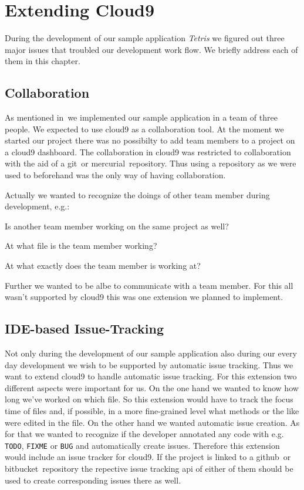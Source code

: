 \section{Extending Cloud9}
\label{sec:Approaches}
During the development of our sample application \emph{Tetris} we figured out three major issues that troubled our development work flow.
We briefly address each of them in this chapter.

\subsection{Collaboration}
As mentioned in~ we implemented our sample application in a team of three people.
We expected to use cloud9 as a collaboration tool.
At the moment we started our project there was no possibilty to add team members to a project on a cloud9 dashboard.
The collaboration in cloud9 was restricted to collaboration with the aid of a git~\needcite or mercurial~\needcite repository.
Thus using a repository as we were used to beforehand was the only way of having collaboration.

Actually we wanted to recognize the doings of other team member during development, e.g.:
\begin{packed_itemize}
    \item Is another team member working on the same project as well?
    \item At what file is the team member working?
    \item At what exactly does the team member is working at?
\end{packed_itemize}
Further we wanted to be albe to communicate with a team member.
For this all wasn't supported by cloud9 this was one extension we planned to implement.

\subsection{IDE-based Issue-Tracking}
Not only during the development of our sample application also during our every day development we wish to be supported by automatic issue tracking.
Thus we want to extend cloud9 to handle automatic issue tracking.
For this extension two different aspects were important for us.
On the one hand we wanted to know how long we've worked on which file.
So this extension would have to track the focus time of files and, if possible, in a more fine-grained level what methods or the like were edited in the file.
On the other hand we wanted automatic issue creation.
As for that we wanted to recognize if the developer annotated any code with e.g. \texttt{TODO}, \texttt{FIXME} or \texttt{BUG} and automatically create issues.
Therefore this extension would include an issue tracker for cloud9.
If the project is linked to a github~\needcite or bitbucket~\needcite repository the repective issue tracking api of either of them should be used to create corresponding issues there as well.

